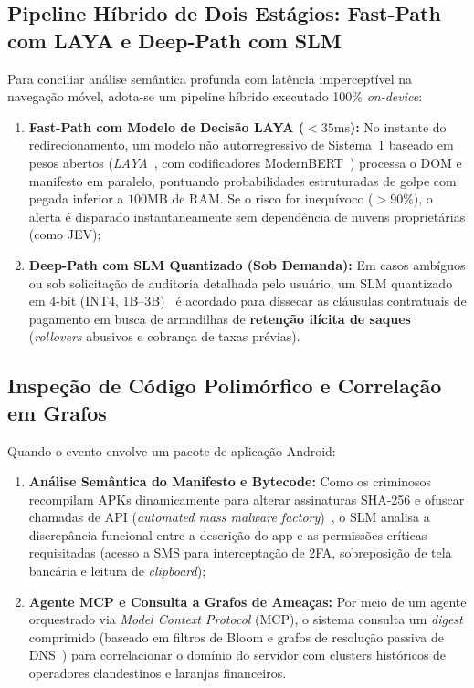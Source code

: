 \subsection{Pipeline H\'{i}brido de Dois Est\'{a}gios: Fast-Path com LAYA e Deep-Path com SLM}
Para conciliar an\'{a}lise sem\^{a}ntica profunda com lat\^{e}ncia impercept\'{i}vel na navega\c{c}\~{a}o móvel, adota-se um pipeline h\'{i}brido executado 100\% \textit{on-device}:
\begin{enumerate}
    \item \textbf{Fast-Path com Modelo de Decis\~{a}o LAYA ($< 35\text{ms}$):} No instante do redirecionamento, um modelo n\~{a}o autorregressivo de Sistema~1 baseado em pesos abertos (\textit{LAYA}~\cite{convai2026laya}, com codificadores ModernBERT~\cite{warner2024modernbert}) processa o DOM e manifesto em paralelo, pontuando probabilidades estruturadas de golpe com pegada inferior a $100\text{MB}$ de RAM. Se o risco for inequ\'{i}voco ($> 90\%$), o alerta \'{e} disparado instantaneamente sem depend\^{e}ncia de nuvens propriet\'{a}rias (como JEV);
    \item \textbf{Deep-Path com SLM Quantizado (Sob Demanda):} Em casos amb\'{i}guos ou sob solicita\c{c}\~{a}o de auditoria detalhada pelo usu\'{a}rio, um SLM quantizado em 4-bit (INT4, 1B--3B)~\cite{liu2024mobilellm} \'{e} acordado para dissecar as cl\'{a}usulas contratuais de pagamento em busca de armadilhas de \textbf{reten\c{c}\~{a}o il\'{i}cita de saques} (\textit{rollovers} abusivos e cobran\c{c}a de taxas pr\'{e}vias).
\end{enumerate}

\subsection{Inspe\c{c}\~{a}o de Código Polimórfico e Correla\c{c}\~{a}o em Grafos}
Quando o evento envolve um pacote de aplica\c{c}\~{a}o Android:
\begin{enumerate}
    \item \textbf{An\'{a}lise Sem\^{a}ntica do Manifesto e Bytecode:} Como os criminosos recompilam APKs dinamicamente para alterar assinaturas SHA-256 e ofuscar chamadas de API (\textit{automated mass malware factory})~\cite{li2025automated,zhang2025fighting}, o SLM analisa a discrep\^{a}ncia funcional entre a descri\c{c}\~{a}o do app e as permiss\~{o}es cr\'{i}ticas requisitadas (acesso a SMS para intercepta\c{c}\~{a}o de 2FA, sobreposi\c{c}\~{a}o de tela banc\'{a}ria e leitura de \textit{clipboard});
    \item \textbf{Agente MCP e Consulta a Grafos de Amea\c{c}as:} Por meio de um agente orquestrado via \textit{Model Context Protocol} (MCP), o sistema consulta um \textit{digest} comprimido (baseado em filtros de Bloom e grafos de resolu\c{c}\~{a}o passiva de DNS~\cite{nabeel2020following}) para correlacionar o dom\'{i}nio do servidor com clusters hist\'{o}ricos de operadores clandestinos e laranjas financeiros.
\end{enumerate}

